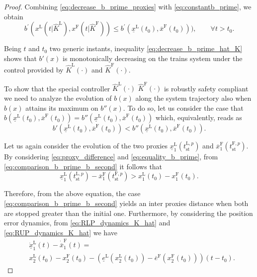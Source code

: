 \documentclass[letterpaper, 10 pt, conference]{ieeeconf}
\theoremstyle{definition}
\theoremstyle{nopoint}
\begin{document}
\begin{proof}
	
	Combining \eqref{eq:decrease_b_prime_proxies}  with \eqref{eq:constantb_prime}, we obtain 
	\begin{equation}\label{eq:decrease_b_prime_hat_K}
		b^\prime(x^\mathrm{L}(t | \hat{K}^\mathrm{L}),x^\mathrm{F}(t | \hat{K}^\mathrm{F}))\leq b^\prime(\underline{x}^\mathrm{L}(t_0),\overline{x}^\mathrm{F}(t_0))), \qquad \forall t>t_0. 
	\end{equation}
	
	Being $t$ and $t_0$ two generic instants, inequality \eqref{eq:decrease_b_prime_hat_K} shows that $b'(x)$ is monotonically decreasing on the trains system under the control provided by $\hat{K}^\mathrm{L}(\cdot)$ and  $\hat{K}^\mathrm{F}(\cdot)$.
	
	To show that the special controller $\hat{K}^\mathrm{L}(\cdot)$ $\hat{K}^\mathrm{F}(\cdot)$ is robustly safety compliant
	we need to analyze the evolution of $b(x)$ along the system trajectory also when $b(x)$ attains its maximum on $b''(x)$. 
	To do so, let us consider the case that $b(\underline{x}^\mathrm{L}(t_0),\overline{x}^\mathrm{F}(t_0))=b''(\underline{x}^\mathrm{L}(t_0),\overline{x}^\mathrm{F}(t_0))$ which, equivalently, reads as
	\begin{equation}\label{eq:comparison_b_prime_b_second}
		b'(\underline{x}^\mathrm{L}(t_0),\overline{x}^\mathrm{F}(t_0)) <b''(\underline{x}^\mathrm{L}(t_0),\overline{x}^\mathrm{F}(t_0)).
	\end{equation} 
	
	Let us again consider the evolution of the two proxies $\underline{x}_1^\mathrm{L}(t_{\mathrm{st}}^{\mathrm{L},p} )$ and $\overline{x}_1^\mathrm{F}(t_{\mathrm{st}}^{\mathrm{F},p} )$. 
	By considering \eqref{eq:proxy_difference} and \eqref{eq:equality_b_prime}, from \eqref{eq:comparison_b_prime_b_second} it follows that  
	\begin{equation}\label{eq:position_comparison}
		\underline{x}_1^\mathrm{L}(t_{\mathrm{st}}^{\mathrm{L},p} ) -\overline{x}_1^\mathrm{F}(t_{\mathrm{st}}^{\mathrm{F},p}  )>
		x_1^\mathrm{L}(t_0)-x_1^\mathrm{F}(t_0).
	\end{equation}
	
	Therefore, from the above equation, the case \eqref{eq:comparison_b_prime_b_second} yields an inter proxies distance when both are stopped greater than the initial one.  
	Furthermore, by considering the position error dynamics, from \eqref{eq:RLP_dynamics_K_hat} and \eqref{eq:RUP_dynamics_K_hat} we have 
	\begin{align}\label{eq:position_error_derivative}
		&\dot{\underline{x}}_1^\mathrm{L}(t)-\dot{\overline{x}}_1^\mathrm{F}(t)= \nonumber \\
		& x_2^\mathrm{L}(t_0)-x_2^\mathrm{F}(t_0)-
		\left(
		\underline{e}^\mathrm{L}\left(x_2^\mathrm{L}(t_0)\right)-
		\overline{e}^\mathrm{F}\left(x_2^\mathrm{F}(t_0)\right)
		\right)(t-t_0).
	\end{align}
	


\end{proof}
\end{document}
